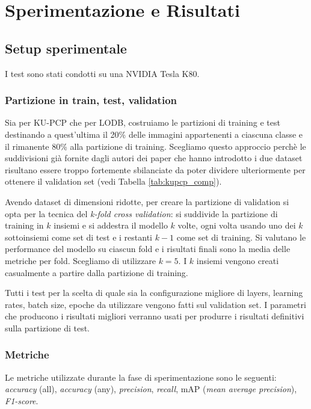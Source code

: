 \chapter{Sperimentazione e Risultati}
\label{risultati}

\section{Setup sperimentale}
I test sono stati condotti su una NVIDIA Tesla K80.


\subsection{Partizione in train, test, validation}

Sia per KU-PCP che per LODB, costruiamo le partizioni di training e test destinando a quest'ultima il 20\% delle immagini appartenenti a ciascuna classe e il rimanente 80\% alla partizione di training. Scegliamo questo approccio perchè le suddivisioni già fornite dagli autori dei paper che hanno introdotto i due dataset risultano essere troppo fortemente sbilanciate da poter dividere ulteriormente per ottenere il validation set (vedi Tabella \ref{tab:kupcp_comp}). 

Avendo dataset di dimensioni ridotte, per creare la partizione di validation si opta per la tecnica del \textit{k-fold cross validation}: si suddivide la partizione di training in \(k\) insiemi e si addestra il modello \(k\) volte, ogni volta usando uno dei \(k\) sottoinsiemi come set di test e i restanti \(k-1\) come set di training. Si valutano le performance del modello su ciascun fold e i risultati finali sono la media delle metriche per fold. Scegliamo di utilizzare \(k=5\). I \(k\) insiemi vengono creati casualmente a partire dalla partizione di training.

Tutti i test per la scelta di quale sia la configurazione migliore di layers, learning rates, batch size, epoche da utilizzare vengono fatti sul validation set. I parametri che producono i risultati migliori verranno usati per produrre i risultati definitivi sulla partizione di test.

\subsection{Metriche}

Le metriche utilizzate durante la fase di sperimentazione sono le seguenti: \textit{accuracy} (all), \textit{accuracy} (any), \textit{precision}, \textit{recall}, mAP (\textit{mean average precision}), \textit{F1-score}.

